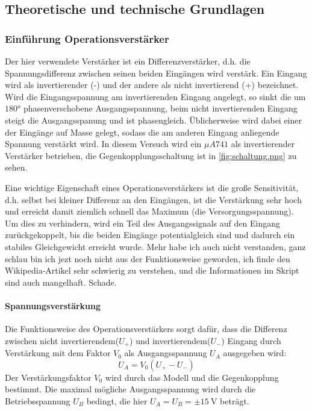 \FloatBarrier

\subsection[Theoretische und technische Grundlagen]{Theoretische und technische Grundlagen \protect\autocite{Skript_2.2}}
\subsubsection{Einführung Operationsverstärker}
Der hier verwendete Verstärker ist ein Differenzverstärker, d.h. die Spannungsdifferenz zwischen seinen beiden Eingängen wird verstärk. Ein Eingang wird als invertierender (-) und der andere als nicht invertierend (+) bezeichnet. Wird die Eingangsspannung am invertierenden Eingang angelegt, so sinkt die um \(\ang{180}\) phasenverschobene Ausgangsspannung, beim nicht invertierenden Eingang steigt die Ausgangsspanung und ist phasengleich. Üblicherweise wird dabei einer der Eingänge auf Masse gelegt, sodass die am anderen Eingang anliegende Spannung verstärkt wird. In diesem Versuch wird ein \(\mu A741\) als invertierender Verstärker betrieben, die Gegenkopplungsschaltung ist in \cref{fig:schaltung.png} zu sehen. 


Eine wichtige Eigenschaft eines Operationsverstärkers ist die große Sensitivität, d.h. selbst bei kleiner Differenz an den Eingängen, ist die Verstärkung sehr hoch und erreicht damit ziemlich schnell das Maximum (die Versorgungsspannung). Um dies zu verhindern, wird ein Teil des Ausgangssignals auf den Eingang zurückgekoppelt, bis die beiden Eingänge potentialgleich sind und dadurch ein stabiles Gleichgewicht erreicht wurde. Mehr habe ich auch nicht verstanden, ganz schlau bin ich jezt noch nicht aus der Funktionsweise geworden, ich finde den Wikipedia-Artikel\autocite{Operationsverstärker} sehr schwierig zu verstehen, und die Informationen im Skript\autocite{Skript_2.2} sind auch mangelhaft. Schade.

\paragraph{Spannungsverstärkung}
Die Funktionsweise des Operationsverstärkers sorgt dafür, dass die Differenz zwischen nicht invertierendem(\(U_+\)) und invertierendem(\(U_-\)) Eingang durch Verstärkung mit dem Faktor \(V_0\) als Ausgangsspannung \(U_A\) ausgegeben wird:
\begin{equation}
    U_A=V_0(U_+-U_-)
\end{equation}  
Der Verstärkungsfaktor \(V_0\) wird durch das Modell und die Gegenkopplung bestimmt.
Die maximal mögliche Ausgangsspannung wird durch die Betriebsspannung \(U_B\) bedingt, die hier \(U_A=U_B=\pm \qty{15}{\volt}\) beträgt.

